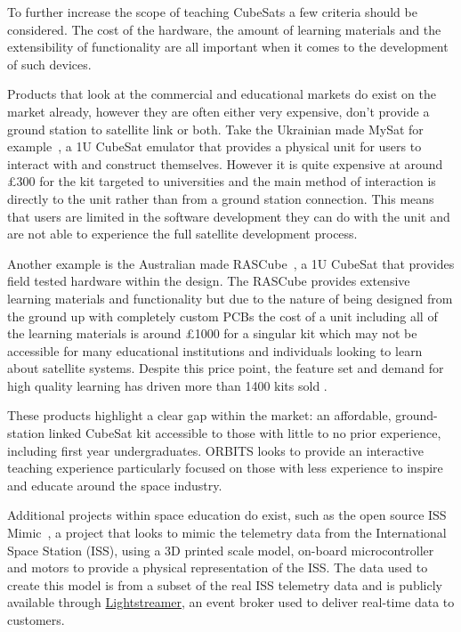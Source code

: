 \documentclass[a4paper,12pt,titlepage]{report}
\begin{document}
To further increase the scope of teaching CubeSats a few criteria should be considered. The cost of the hardware, the amount of learning materials and the extensibility of functionality are all important when it comes to the development of such devices.

Products that look at the commercial and educational markets do exist on the market already, however they are often either very expensive, don't provide a ground station to satellite link or both. Take the Ukrainian made MySat for example~\cite{MySat}, a 1U CubeSat emulator that provides a physical unit for users to interact with and construct themselves. However it is quite expensive at around \pounds 300 for the kit targeted to universities and the main method of interaction is directly to the unit rather than from a ground station connection. This means that users are limited in the software development they can do with the unit and are not able to experience the full satellite development process.

Another example is the Australian made RASCube~\cite{RASCube}, a 1U CubeSat that provides field tested hardware within the design. The RASCube provides extensive learning materials and functionality but due to the nature of being designed from the ground up with completely custom PCBs the cost of a unit including all of the learning materials is around \pounds 1000 for a singular kit which may not be accessible for many educational institutions and individuals looking to learn about satellite systems. Despite this price point, the feature set and demand for high quality learning has driven more than 1400 kits sold \cite{RASCube}.

These products highlight a clear gap within the market: an affordable, ground-station linked CubeSat kit accessible to those with little to no prior experience, including first year undergraduates. ORBITS looks to provide an interactive teaching experience particularly focused on those with less experience to inspire and educate around the space industry.

Additional projects within space education do exist, such as the open source ISS Mimic~\cite{ISS-Mimic}, a project that looks to mimic the telemetry data from the International Space Station (ISS), using a 3D printed scale model, on-board microcontroller and motors to provide a physical representation of the ISS. The data used to create this model is from a subset of the real ISS telemetry data and is publicly available through \href{https://lightstreamer.com/}{Lightstreamer}, an event broker used to deliver real-time data to customers. 
\end{document}
